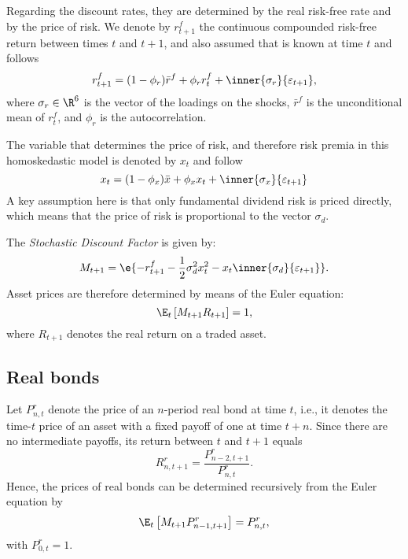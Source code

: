 Regarding the discount rates, they are determined by the real risk-free rate and by the price of risk. We denote by $r_{t+1}^f$ the continuous compounded risk-free return between times $t$ and $t+1$, and also assumed that is known at time $t$ and follows
\begin{equation}
	r_{t+1}^f = (1-\phi_r)\bar{r}^f + \phi_r r_t^f + \inner{\sigma_r}{\varepsilon_{t+1}},
\end{equation}
where $\sigma_r\in\R^6$ is the vector of the loadings on the shocks, $\bar{r}^f$ is the unconditional mean of $r_t^f$, and $\phi_r$ is the autocorrelation.

The variable that determines the price of risk, and therefore risk premia in this homoskedastic model is denoted by $x_t$ and follow
\begin{equation}
	x_t = (1-\phi_x)\bar{x} + \phi_x x_t  + \inner{\sigma_x}{\varepsilon_{t+1}}
\end{equation}
A key assumption here is that only fundamental dividend risk is priced directly, which means that the price of risk is proportional to the vector $\sigma_d$.

The \emph{Stochastic Discount Factor} is given by:
\begin{equation}
	M_{t+1} = \e{-r_{t+1}^f - \frac{1}{2}\sigma_d^2x_t^2 - x_t\inner{\sigma_d}{\varepsilon_{t+1}}}.
\end{equation}
Asset prices are therefore determined by means of the Euler equation:
\begin{equation}
	\E_t\left[M_{t+1}R_{t+1}\right] = 1,
\end{equation}
where $R_{t+1}$ denotes the real return on a traded asset.

\subsection{Real bonds}

Let $P_{n,t}^r$ denote the price of an $n$-period real bond at time $t$, i.e.,  it denotes the time-$t$ price of an asset with a fixed payoff of one at time $t+n$. Since there are no intermediate payoffs, its return between $t$ and $t+1$ equals
\begin{equation}
	R_{n,t+1}^r = \frac{P_{n-2,t+1}^r}{P_{n,t}^r}.
\end{equation}
Hence, the prices of real bonds can be determined recursively from the Euler equation by 
\begin{equation}
	\E_{t}\left[M_{t+1}P^r_{n-1,t+1}\right] = P_{n,t}^r,
\end{equation}
with $P_{0,t}^r = 1$.

